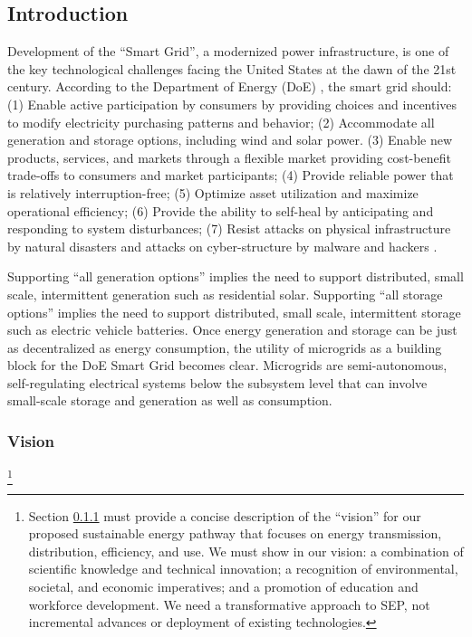 
\subsection{Introduction}

Development of the ``Smart Grid'', a modernized power infrastructure, is
one of the key technological challenges facing the United States at the
dawn of the 21st century. According to the Department of Energy (DoE) , the smart
grid should: (1) Enable active participation by consumers by providing
choices and incentives to modify electricity purchasing patterns and
behavior; (2) Accommodate all generation and storage options, including
wind and solar power.  (3) Enable new products, services, and markets
through a flexible market providing cost-benefit trade-offs to consumers
and market participants; (4) Provide reliable power that is relatively
interruption-free; (5) Optimize asset utilization and maximize operational
efficiency; (6) Provide the ability to self-heal by anticipating and
responding to system disturbances; (7) Resist attacks on physical
infrastructure by natural disasters and attacks on cyber-structure by
malware and hackers \cite{NETL:GridCharacteristics}.

Supporting ``all generation options'' implies the need to support
distributed, small scale, intermittent generation such as residential
solar.  Supporting ``all storage options'' implies the need to support
distributed, small scale, intermittent storage such as electric vehicle
batteries.  Once energy generation and storage can be just as decentralized
as energy consumption, the utility of microgrids as a building block for
the DoE Smart Grid becomes clear.  Microgrids are semi-autonomous,
self-regulating electrical systems below the subsystem level that can
involve small-scale storage and generation as well as consumption. 

\subsubsection{Vision}
\label{sec:vision}

\footnote{Section \ref{sec:vision} must provide a concise description of the ``vision'' for our
  proposed sustainable energy pathway that focuses on energy transmission,
  distribution, efficiency, and use.
  We must show in our vision: a combination of scientific knowledge and
  technical innovation; a recognition of environmental, societal, and
  economic imperatives; and a promotion of education and workforce
  development.
  We need a transformative approach to SEP, not incremental advances or
  deployment of existing technologies. }

